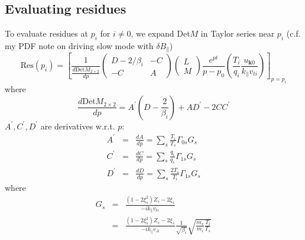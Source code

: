 \documentclass[12pt]{article}
\begin{document}
\subsection{Evaluating residues}
To evaluate residues at $p_i$ for $i\neq 0$, we expand Det$M$ in Taylor series near $p_i$  (c.f. my PDF note on driving slow mode with $\delta B_\parallel$)
%
\begin{equation}
\mathrm{Res}(p_i) = 
\left[
\frac{1}{\frac{d\mathrm{Det}M_{2\times2}}{dp}}
\begin{pmatrix}
D-2/\beta_i  & -C\\
-C & A
\end{pmatrix}
\begin{pmatrix}
L\\
M
\end{pmatrix}
 \frac{e^{pt}}{p-p_0}
 \left( \frac{T_i}{q_i} \frac{u_{\mathbf{k}0}}{k_\parallel v_{ti}}\right)
\right]_{p=p_i}
\end{equation}
where 
\begin{equation}
\frac{d\mathrm{Det}M_{2\times2}}{dp} = A^\prime\left(D-\frac{2}{\beta_i}\right) + 
AD^\prime - 2CC^\prime 
\end{equation}
%
$A^\prime, C^\prime, D^\prime$ are derivatives w.r.t. $p$:
\begin{eqnarray}
A^\prime &=&\frac{dA}{dp} = \sum_s \frac{T_i}{T_s} \Gamma_{0s}G_s \\
C^\prime &=& \frac{dC}{dp} = \sum_s \frac{q_i}{q_s} \Gamma_{1s} G_s \\
D^\prime &=& \frac{dD}{dp} = \sum_s \frac{2T_s}{T_i} \Gamma_{1s} G_s 
\end{eqnarray}
where 
\begin{eqnarray}
G_s &=& \frac{\left(1-2\xi_s^2\right) Z_s - 2 \xi_s}{-ik_\parallel v_{ts}} \nonumber \\
&=& \frac{\left(1-2\xi_s^2\right) Z_s - 2 \xi_s}{-ik_\parallel v_{A}} \frac{1}{\sqrt{\beta_i}}
\sqrt{\frac{m_s}{m_i}\frac{T_i}{T_s}}
\end{eqnarray}



%
%
\end{document}
